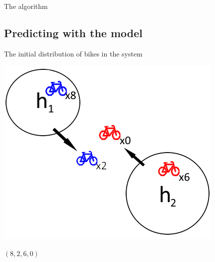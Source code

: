 \begin{frame}{The algorithm}

\end{frame}

\subsection{Predicting with the model}

\begin{frame}{}
	
\begin{center}
The initial distribution of bikes in the system

\includegraphics[scale=0.7]{graphics/initialworld2}
	
$ (8,2,6,0) $
\end{center}
\end{frame}

